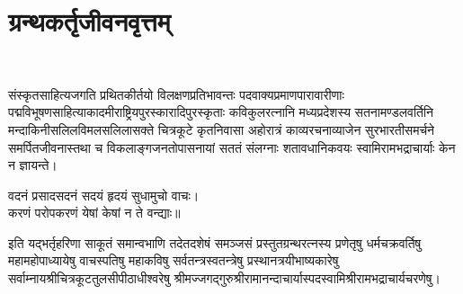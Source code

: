 \chapter[ग्रन्थकर्तृजीवनवृत्तम्]{ग्रन्थकर्तृजीवनवृत्तम्}
\fontsize{14}{21}\selectfont
\vspace{-4mm}
\nopagebreak\\
\vspace{4mm}
\begin{sloppypar}\justifying\noindent\hspace{10mm} संस्कृत\-साहित्य\-जगति प्रथित\-कीर्तयो विलक्षण\-प्रतिभा\-वन्तः पदवाक्य\-प्रमाण\-पारावारीणाः पद्मविभूषण\-साहित्याकादमी\-राष्ट्रिय\-पुरस्कारादि\-पुरस्कृताः कविकुलरत्नानि मध्यप्रदेशस्य सतना\-मण्डल\-वर्तिनि मन्दाकिनी\-सलिल\-विमल\-सलिलासक्ते चित्रकूटे कृतनिवासा अहोरात्रं काव्य\-रचना\-व्याजेन सुरभारती\-समर्चने समर्पित\-जीवनास्तथा च 
विकलाङ्ग\-जनतोपासनायां सततं संलग्नाः शतावधानि\-कवयः स्वामि\-रामभद्राचार्याः केन न ज्ञायन्ते।\end{sloppypar}
\vspace{-2mm}
\begin{center}
वदनं प्रसादसदनं सदयं हृदयं सुधामुचो वाचः।\nopagebreak\\
करणं परोपकरणं येषां केषां न ते वन्द्याः॥\\
\end{center}
\vspace{-2mm}
\begin{sloppypar}\justifying\noindent\hspace{10mm} इति यद्भर्तृहरिणा 
साकूतं समान्वभाणि तदेतदशेषं समञ्जसं प्रस्तुतग्रन्थ\-रत्नस्य प्रणेतृषु धर्मचक्रवर्तिषु महामहोपाध्यायेषु वाचस्पतिषु महाकविषु सर्वतन्त्र\-स्वतन्त्रेषु प्रस्थानत्रयी\-भाष्यकारेषु सर्वाम्नाय\-श्रीचित्रकूट\-तुलसी\-पीठाधीश्वरेषु श्रीमज्जगद्गुरु\-श्रीरामानन्दाचार्यास्पद\-स्वामि\-श्रीरामभद्राचार्यचरणेषु।\end{sloppypar}
